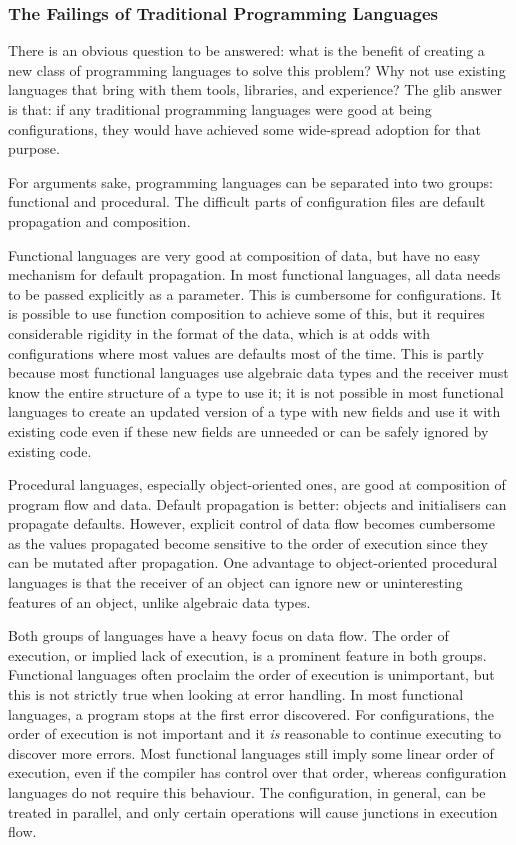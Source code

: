 \documentclass[letterpaper,twocolumn,10pt]{article}
\begin{document}
\subsubsection{The Failings of Traditional Programming Languages}
There is an obvious question to be answered: what is the benefit of creating a new class of programming languages to solve this problem? Why not use existing languages that bring with them tools, libraries, and experience? The glib answer is that: if any traditional programming languages were good at being configurations, they would have achieved some wide-spread adoption for that purpose.

For arguments sake, programming languages can be separated into two groups: functional and procedural. The difficult parts of configuration files are default propagation and composition.

Functional languages are very good at composition of data, but have no easy mechanism for default propagation. In most functional languages, all data needs to be passed explicitly as a parameter. This is cumbersome for configurations. It is possible to use function composition to achieve some of this, but it requires considerable rigidity in the format of the data, which is at odds with configurations where most values are defaults most of the time. This is partly because most functional languages use algebraic data types and the receiver must know the entire structure of a type to use it; it is not possible in most functional languages to create an updated version of a type with new fields and use it with existing code even if these new fields are unneeded or can be safely ignored by existing code.

Procedural languages, especially object-oriented ones, are good at composition of program flow and data. Default propagation is better: objects and initialisers can propagate defaults. However, explicit control of data flow becomes cumbersome as the values propagated become sensitive to the order of execution since they can be mutated after propagation. One advantage to object-oriented procedural languages is that the receiver of an object can ignore new or uninteresting features of an object, unlike algebraic data types.

Both groups of languages have a heavy focus on data flow. The order of execution, or implied lack of execution, is a prominent feature in both groups. Functional languages often proclaim the order of execution is unimportant, but this is not strictly true when looking at error handling. In most functional languages, a program stops at the first error discovered. For configurations, the order of execution is not important and it \emph{is} reasonable to continue executing to discover more errors. Most functional languages still imply some linear order of execution, even if the compiler has control over that order, whereas configuration languages do not require this behaviour. The configuration, in general, can be treated in parallel, and only certain operations will cause junctions in execution flow.
\end{document}
